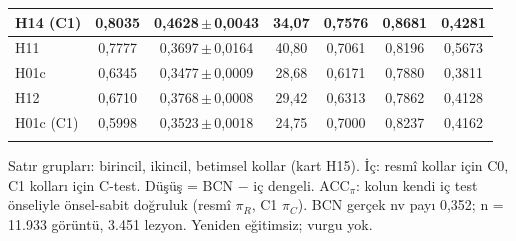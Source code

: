 \begin{table}[!htbp]
\begin{tabular*}{\textwidth}{@{\extracolsep{\fill}}lcccccc}
H14 (C1) & 0,8035 & 0,4628\,$\pm$\,0,0043 & \textminus{}34,07 & 0,7576 & 0,8681 & 0,4281 \\
\midrule
H11 & 0,7777 & 0,3697\,$\pm$\,0,0164 & \textminus{}40,80 & 0,7061 & 0,8196 & 0,5673 \\
H01c & 0,6345 & 0,3477\,$\pm$\,0,0009 & \textminus{}28,68 & 0,6171 & 0,7880 & 0,3811 \\
H12 & 0,6710 & 0,3768\,$\pm$\,0,0008 & \textminus{}29,42 & 0,6313 & 0,7862 & 0,4128 \\
H01c (C1) & 0,5998 & 0,3523\,$\pm$\,0,0018 & \textminus{}24,75 & 0,7000 & 0,8237 & 0,4162 \\
\botrule
\end{tabular*}
\par\smallskip\raggedright Satır grupları: birincil, ikincil, betimsel kollar (kart H15). İç: resmî kollar için C0, C1 kolları için C-test. Düşüş = BCN $-$ iç dengeli. ACC$_{\pi}$: kolun kendi iç test önseliyle önsel-sabit doğruluk (resmî $\pi_R$, C1 $\pi_C$). BCN gerçek nv payı 0,352; n = 11.933 görüntü, 3.451 lezyon. Yeniden eğitimsiz; vurgu yok.
\end{table}

